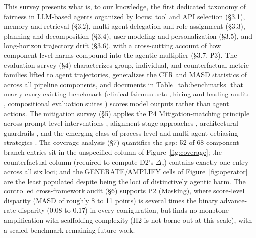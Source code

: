 \documentclass[acmsmall,nonacm]{acmart}
\begin{document}
This survey presents what is, to our knowledge, the first dedicated taxonomy of fairness in LLM-based agents organized by locus: tool and API selection (\S{}3.1), memory and retrieval (\S{}3.2), multi-agent delegation and role assignment (\S{}3.3), planning and decomposition (\S{}3.4), user modeling and personalization (\S{}3.5), and long-horizon trajectory drift (\S{}3.6), with a cross-cutting account of how component-level harms compound into the agentic multiplier (\S{}3.7, P3). The evaluation survey (\S{}4) characterizes group, individual, and counterfactual metric families lifted to agent trajectories, generalizes the CFR and MASD statistics of \cite{mayilvaghanan2026counterfactual} across all pipeline components, and documents in Table~\ref{tab:benchmarks} that nearly every existing benchmark (clinical fairness sets \cite{xiao2025fairmedqa,adappanavar2025mfarm,ghosh2025medequalqa}, hiring and lending audits \cite{an2025measuring,azime2025accept}, compositional evaluation suites \cite{wang2024ceb}) scores model outputs rather than agent actions. The mitigation survey (\S{}5) applies the P4 Mitigation-matching principle across prompt-level interventions \cite{furniturewala2024thinking,li2024prompting}, alignment-stage approaches \cite{allam2024biasdpo,bai2022constitutional}, architectural guardrails \cite{dong2024building}, and the emerging class of process-level and multi-agent debiasing strategies \cite{owens2024multi,choi2025identity,ki2025multiple}. The coverage analysis (\S{}7) quantifies the gap: 52 of 68 component-branch entries sit in the unspecified column of Figure~\ref{fig:coverage}; the counterfactual column (required to compute D2's $\Delta_c$) contains exactly one entry across all six loci; and the GENERATE/AMPLIFY cells of Figure~\ref{fig:operator} are the least populated despite being the loci of distinctively agentic harm. The controlled cross-framework audit (\S{}6) supports P2 (Masking), where score-level disparity (MASD of roughly 8 to 11 points) is several times the binary advance-rate disparity (0.08 to 0.17) in every configuration, but finds no monotone amplification with scaffolding complexity (H2 is not borne out at this scale), with a scaled benchmark remaining future work.
\end{document}
